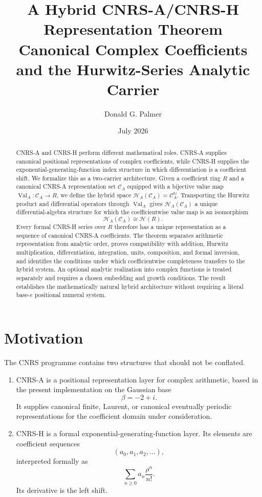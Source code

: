 \documentclass[11pt]{article}
\title{\textbf{A Hybrid CNRS-A/CNRS-H Representation Theorem}\\
\large Canonical Complex Coefficients and the Hurwitz-Series Analytic Carrier}
\author{Donald G. Palmer}
\date{July 2026}
\newcommand{\N}{\mathbb N}
\newcommand{\HA}{\mathcal H_A}
\newcommand{\HR}{\mathcal H}
\newcommand{\CA}{\mathcal C_A}
\newcommand{\Val}{\operatorname{Val}_A}
\begin{document}
\maketitle

\begin{abstract}
CNRS-A and CNRS-H perform different mathematical roles.  CNRS-A supplies canonical positional representations of complex coefficients, while CNRS-H supplies the exponential-generating-function index structure in which differentiation is a coefficient shift.  We formalize this as a two-carrier architecture.  Given a coefficient ring $R$ and a canonical CNRS-A representation set $\CA$ equipped with a bijective value map $\Val:\CA\to R$, we define the hybrid space $\HA(\CA)=\CA^{\N}$.  Transporting the Hurwitz product and differential operators through $\Val$ gives $\HA(\CA)$ a unique differential-algebra structure for which the coefficientwise value map is an isomorphism
\[
\HA(\CA)\cong\HR(R).
\]
Every formal CNRS-H series over $R$ therefore has a unique representation as a sequence of canonical CNRS-A coefficients.  The theorem separates arithmetic representation from analytic order, proves compatibility with addition, Hurwitz multiplication, differentiation, integration, units, composition, and formal inversion, and identifies the conditions under which coefficientwise completeness transfers to the hybrid system.  An optional analytic realization into complex functions is treated separately and requires a chosen embedding and growth conditions.  The result establishes the mathematically natural hybrid architecture without requiring a literal base-$e$ positional numeral system.
\end{abstract}

\section{Motivation}

The CNRS programme contains two structures that should not be conflated.

\begin{enumerate}[label=(\roman*)]
\item CNRS-A is a positional representation layer for complex arithmetic, based in the present implementation on the Gaussian base
\[
\beta=-2+i.
\]
It supplies canonical finite, Laurent, or canonical eventually periodic representations for the coefficient domain under consideration.

\item CNRS-H is a formal exponential-generating-function layer.  Its elements are coefficient sequences
\[
(a_0,a_1,a_2,\ldots),
\]
interpreted formally as
\[
\sum_{n\ge0}a_n\frac{\rho^n}{n!}.
\]
Its derivative is the left shift.
\end{enumerate}
\end{document}
